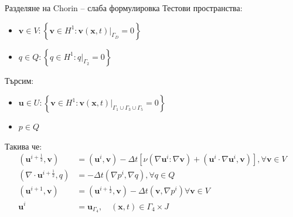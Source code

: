\documentclass{beamer}
\newcommand{\dotprod}[2]{\left(#1, #2\right)}
\newcommand{\divg}[1]{\nabla\cdot#1}
\newcommand{\grad}[1]{\nabla#1}
\newcommand{\vecf}[1]{\boldsymbol{#1}}
\begin{document}
    \begin{frame}{Разделяне на Chorin -- слаба формулировка}
    		Тестови пространства:
    		\begin{itemize}
    			\item $\mathbf{v} \in V : \left\{\mathbf{v} \in H^1 : \mathbf{v}(\mathbf{x}, t)|_{\Gamma_D} = 0 \right\}$
    			\item $q \in Q : \left\{q \in H^1 : q|_{\Gamma_2} = 0\right\}$
    		\end{itemize}
    		Търсим:
    		\begin{itemize}
    		\item $\mathbf{u} \in U : \left\{\mathbf{v} \in H^1 : \mathbf{v}(\mathbf{x}, t)|_{\Gamma_1 \cup \Gamma_3 \cup \Gamma_5} = 0\right\}$
    		\item $p \in Q$
    		\end{itemize}
    		Такива че:
    		\begin{align*}
    			\dotprod{\vecf{u}^{i + \frac{1}{2}}}{\vecf{v}} &= \dotprod{\vecf{u}^i}{\vecf{v}} - \Delta t \left[\nu\left(\grad{\vecf{u}^i} : \grad{\vecf{v}}\right) + \dotprod{\vecf{u}^i \cdot \grad{\vecf{u}^i}}{\vecf{v}}\right], \forall\mathbf{v} \in V \\
    			\dotprod{\divg{\vecf{u}^{i + \frac{1}{2}}}}{q} &= - \Delta t \dotprod{\grad{p^i}}{\grad{q}}, \forall q \in Q\\
    			\dotprod{\vecf{u}^{i+1}}{\vecf{v}} &= \dotprod{\vecf{u}^{i+\frac{1}{2}}}{\vecf{v}} - \Delta t\dotprod{\vecf{v}} {\grad{p^i}} \forall\mathbf{v} \in V \\
    			 \vecf{u}^i &= \vecf{u}_{\Gamma_4}, \quad \left(\mathbf{x}, t\right) \in \Gamma_4 \times J
    		\end{align*}
    \end{frame}
\end{document}
